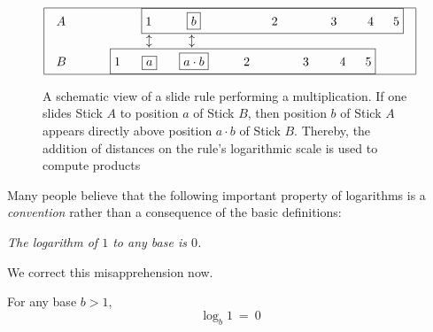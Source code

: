 \begin{figure}[htb]
\[ 
\begin{array}{|c|}
\hline
\begin{array}{ll}
A \hspace*{.35in} &
\hspace*{.35in}
\fbox{$1$ \hspace*{.3in} \fbox{$b$} 
\hspace*{.7in} $2$ 
\hspace*{.5in} $3$ 
\hspace*{.25in} $4$ 
\hspace*{.125in} $5$} \\ 
  &
\hspace*{.4in} \updownarrow \hspace*{.41in} \updownarrow \\
B \hspace*{.35in} &
\fbox{$1$\hspace*{.24in}\fbox{$a$}\hspace*{.25in}\fbox{$a \cdot b$}
\hspace*{.3in} $2$ 
\hspace*{.5in} $3$ 
\hspace*{.25in} $4$ 
\hspace*{.125in} $5$}
\end{array}
 \\
\hline
\end{array}
\]
\caption{A schematic view of a slide rule performing a multiplication.  If one slides Stick $A$ to position $a$ of Stick $B$, then position $b$ of Stick $A$ appears directly above position $a \cdot b$ of Stick $B$.  Thereby, the addition of distances on the rule's logarithmic scale is used to compute products}
\label{fig:slide-rule}
\end{figure}

\bigskip

\noindent
Many people believe that the following important property of logarithms is a {\em convention} rather than a consequence of the basic definitions:

\smallskip

 {\em The logarithm of $1$ to any base is $0$.}

\smallskip

\noindent We correct this misapprehension now.

\smallskip

\begin{prop}
\label{thm:log1=0}
For any base $b >1$,
\[ \log_b 1 \ = \ 0 \]
\end{prop}

